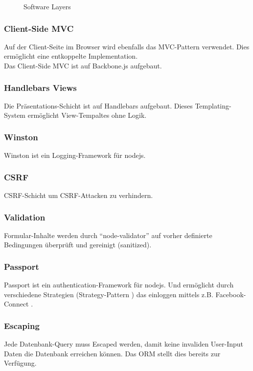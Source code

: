 \begin{figure}[ht!]
	\centering{
		
	}

	\caption{Software Layers}
\end{figure}

\subsubsection*{Client-Side MVC}
Auf der Client-Seite im Browser wird ebenfalls das MVC-Pattern \cite{MVC} verwendet. Dies ermöglicht eine entkoppelte Implementation.\\
Das Client-Side MVC ist auf Backbone.js \cite{Backbonejs} aufgebaut.

\subsubsection*{Handlebars Views}
Die Präsentations-Schicht ist auf Handlebars \cite{Handlebars} aufgebaut. Dieses Templating-System ermöglicht View-Tempaltes ohne Logik.

\subsubsection*{Winston}
Winston \cite{Winston} ist ein Logging-Framework für \gls{nodejs}.

\subsubsection*{CSRF}
\gls{CSRF}-Schicht um CSRF-Attacken zu verhindern.

\subsubsection*{Validation}
Formular-Inhalte werden durch ``node-validator'' \cite{nodevalidator} auf vorher definierte Bedingungen überprüft und gereinigt (sanitized).

\subsubsection*{Passport}
Passport \cite{Passportjs} ist ein authentication-Framework für \gls{nodejs}. Und ermöglicht durch verschiedene Strategien (Strategy-Pattern \cite{StrategyPattern}) das einloggen mittels z.B. Facebook-Connect \cite{FacebookConnect}.

\subsubsection*{Escaping}
Jede Datenbank-Query muss Escaped werden, damit keine invaliden User-Input Daten die Datenbank erreichen können. Das ORM stellt dies bereits zur Verfügung.